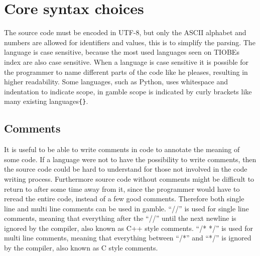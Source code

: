 \section{Core syntax choices}
The source code must be encoded in UTF-8, but only the ASCII alphabet and numbers are allowed for identifiers and values, this is to simplify the parsing. 
The language is case sensitive, because the most used languages seen on TIOBEs index are also case sensitive.\citep{TIOBE}
When a language is case sensitive it is possible for the programmer to name different parts of the code like he pleases, resulting in higher readability. 
Some languages, such as Python, uses whitespace and indentation to indicate scope, in \gls{gamble} scope is indicated by curly brackets like many existing languages\texttt{\{\}}.  

\subsection*{Comments}
It is useful to be able to write comments in code to annotate the meaning of some code.
If a language were not to have the possibility to write comments, then the source code could be hard to understand for those not involved in the code writing process.
Furthermore source code without comments might be difficult to return to after some time away from it, since the programmer would have to reread the entire code, instead of a few good comments.\citep{Commenting}
Therefore both single line and multi line comments can be used in \gls{gamble}. 
``//'' is used for single line comments, meaning that everything after the ``//'' until the next newline is ignored by the compiler, also known as C++ style comments. 
``/* */'' is used for multi line comments, meaning that everything between ``/*'' and ``*/'' is ignored by the compiler, also known as C style comments.\citep{C_comment,Cplus_comment}

